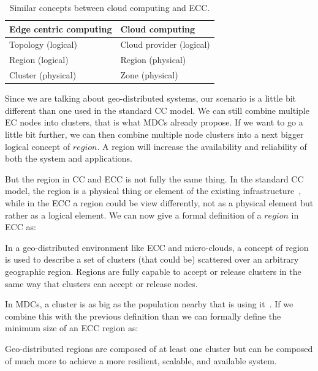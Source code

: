 \begin{table}[h!]
	\begin{center}
		\begin{tabular}{l|l}
			\textbf{Edge centric computing} & \textbf{Cloud computing}\\
			\hline
			Topology (logical) & Cloud provider (logical)\\
			Region (logical) & Region (physical)\\
			Cluster (physical) & Zone (physical)\\
		\end{tabular}
	\end{center}
	\vspace{-0.5cm}
	\caption{Similar concepts between cloud computing and ECC.}
	\label{tab:table5}
\end{table}

\noindent
Since we are talking about geo-distributed systems, our scenario is a little bit different than one used in the standard CC model. We can still combine multiple EC nodes into clusters, that is what MDCs already propose. If we want to go a little bit further, we can then combine multiple node clusters into a next bigger logical concept of $region$. A region will increase the availability and reliability of both the system and applications. 

But the region in CC and ECC is not fully the same thing. In the standard CC model, the region is a physical thing or element of the existing infrastructure~\cite{SouzaMFAK19}, while in the ECC a region could be view differently, not as a physical element but rather as a logical element. We can now give a formal definition of a $region$ in ECC as:

\begin{definition}
	In a geo-distributed environment like ECC and micro-clouds, a concept of region is used to describe a set of clusters (that could be) scattered over an arbitrary geographic region. Regions are fully capable to accept or release clusters in the same way that clusters can accept or release nodes.
\end{definition}

In MDCs, a cluster is as big as the population nearby that is using it~\cite{GreenbergHMP09}. If we combine this with the previous definition than we can formally define the minimum size of an ECC region as:

\begin{definition}
	Geo-distributed regions are composed of at least one cluster but can be composed of much more to achieve a more resilient, scalable, and available system.
\end{definition}

